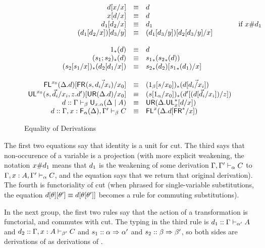 \begin{figure}
\[
\begin{array}{rcll} 
d[{x}/x] & \equiv & d \\
{x}[d/x] & \equiv & d \\
d_1[d_2/x] & \equiv & d_1 & \text{if $x \# d_1$}\\
(d_1[d_2/x])[d_3/y] & \equiv & (d_1[d_3/y])[d_2[d_3/y]/x]\\
\\
1_*(d) & \equiv & d\\
(s_1;s_2)_*(d) & \equiv & {s_1}_*({s_2}_*(d)) \\
(s_2[s_1/x])_*(d_2[d_1/x]) & \equiv & {s_2}_*(d_2)[{s_1}_*(d_1)/x] \\
\\
\mathsf{FL}^{x_0}(\Delta.d)[\mathsf{FR}_{}(s,\vec{d_i/x_i})/x_0] & \equiv & (1_\beta[s/x_0])_*(d[\vec{d_i/x_i}]) \\
\mathsf{UL}^{x_0}_{}(s,\vec{d_i}/x_i,z.d')[\mathsf{UR}(\Delta.d)/x_0] & \equiv & (s[1_{\alpha}/{x_0}])_*(d'[(d[{\vec{d_i}/x_i}])/z]) \\
d :: \Gamma \vdash_{\beta} \mathsf{U}_{x.\alpha}(\Delta \mid A) & \equiv & \mathsf{UR}(\Delta.\mathsf{UL}^*_{x}[d/x])\\
d :: \Gamma,x:\mathsf{F}_{\alpha}(\Delta),\Gamma' \vdash_{\beta} C & \equiv & \mathsf{FL}^{x}(\Delta.d[\mathsf{FR}^*/x])\\
\end{array}
\]
\caption{Equality of Derivations}
\label{fig:equality-of-derivations}
\end{figure}

The first two equations say that identity is a unit for cut.  The third
says that non-occurence of a variable is a projection (with more
explicit weakening, the notation $x \# d_1$ means that $d_1$ is the
weakening of some derivation $\Gamma,\Gamma' \vdash_{\alpha} C$ to
$\Gamma,x:A,\Gamma' \vdash_{\alpha} C$, and the equation says that we
return that original derivation).  The fourth is functoriality of cut
(when phrased for single-variable substitutions, the equation
$d[\theta][\theta'] \equiv d[\theta[\theta']]$ becomes a rule for
commuting substitutions).

In the next group, the first two rules say that the action of a
transformation is functorial, and commutes with cut.  The typing in the
third rule is $d_1 :: \Gamma \vdash_{\alpha'} A$ and $d_2 ::
\Gamma,x:A \vdash_{\beta'} C$ and $s_1 :: \alpha \Rightarrow \alpha'$ and $s_2
:: \beta \Rightarrow \beta'$, so both sides are derivations of as derivations
of .

